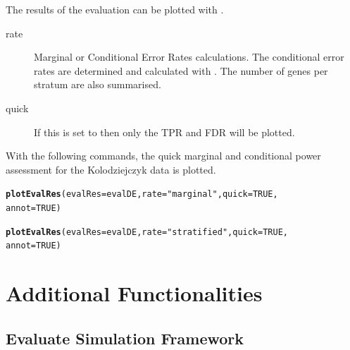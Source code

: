 \documentclass{article}\usepackage[]{graphicx}\usepackage[usenames,dvipsnames]{color}
\makeatletter
\newcommand{\hlnum}[1]{\textcolor[rgb]{0.686,0.059,0.569}{#1}}%
\newcommand{\hlstr}[1]{\textcolor[rgb]{0.192,0.494,0.8}{#1}}%
\newcommand{\hlstd}[1]{\textcolor[rgb]{0.345,0.345,0.345}{#1}}%
\newcommand{\hlkwc}[1]{\textcolor[rgb]{0.333,0.667,0.333}{#1}}%
\newcommand{\hlkwd}[1]{\textcolor[rgb]{0.737,0.353,0.396}{\textbf{#1}}}%
\newenvironment{kframe}{%
 \def\at@end@of@kframe{}%
 \ifinner\ifhmode%
  \def\at@end@of@kframe{\end{minipage}}%
  \begin{minipage}{\columnwidth}%
 \fi\fi%
 \def\FrameCommand##1{\hskip\@totalleftmargin \hskip-\fboxsep
 \colorbox{shadecolor}{##1}\hskip-\fboxsep
     \hskip-\linewidth \hskip-\@totalleftmargin \hskip\columnwidth}%
 \MakeFramed {\advance\hsize-\width
   \@totalleftmargin\z@ \linewidth\hsize
   \@setminipage}}%
 {\par\unskip\endMakeFramed%
 \at@end@of@kframe}
\newenvironment{knitrout}{}{} %
\makeatother
\begin{document}
The results of the evaluation can be plotted with .
\begin{description}
  \item[rate] Marginal or Conditional Error Rates calculations. The conditional error rates are determined and calculated with . The number of genes per stratum are also summarised.
  \item[quick] If this is set to  then only the TPR and FDR will be plotted.
\end{description}

With the following commands, the quick marginal and conditional power assessment for the Kolodziejczyk data is plotted.

\begin{knitrout}
\color{fgcolor}\begin{kframe}
\begin{alltt}
\hlkwd{plotEvalRes}\hlstd{(}\hlkwc{evalRes} \hlstd{= evalDE,} \hlkwc{rate} \hlstd{=} \hlstr{"marginal"}\hlstd{,} \hlkwc{quick} \hlstd{=} \hlnum{TRUE}\hlstd{,}
    \hlkwc{annot} \hlstd{=} \hlnum{TRUE}\hlstd{)}

\hlkwd{plotEvalRes}\hlstd{(}\hlkwc{evalRes} \hlstd{= evalDE,} \hlkwc{rate} \hlstd{=} \hlstr{"stratified"}\hlstd{,} \hlkwc{quick} \hlstd{=} \hlnum{TRUE}\hlstd{,}
    \hlkwc{annot} \hlstd{=} \hlnum{TRUE}\hlstd{)}
\end{alltt}
\end{kframe}
\end{knitrout}

\section{Additional Functionalities}

\subsection{Evaluate Simulation Framework}
\end{document}
